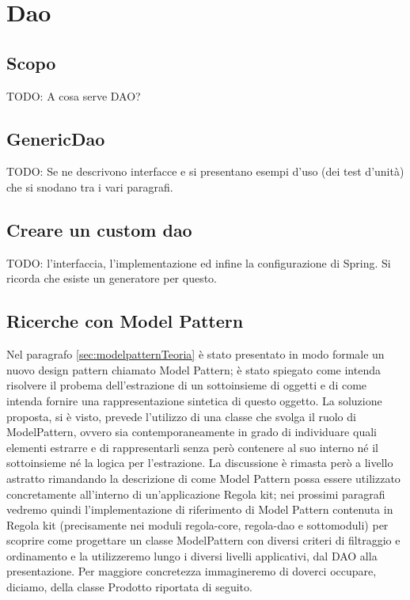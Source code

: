 \chapter{Dao}

\section{Scopo}
TODO: A cosa serve DAO?

\section{GenericDao}
TODO: Se ne descrivono interfacce e si presentano esempi d'uso (dei test d'unità) che si snodano tra i vari paragrafi.

\section{Creare un custom dao}
TODO: l'interfaccia, l'implementazione ed infine la configurazione di Spring. Si ricorda che esiste un generatore per questo.

\section{Ricerche con Model Pattern}\label{sec:modelpattern}
Nel paragrafo \vref{sec:modelpatternTeoria} è stato presentato in modo formale un nuovo design pattern chiamato Model Pattern; è stato spiegato come intenda risolvere il probema dell'estrazione di un sottoinsieme di oggetti e di come intenda fornire una rappresentazione sintetica di questo oggetto. La soluzione proposta, si è visto, prevede l'utilizzo di una classe che svolga il ruolo di ModelPattern, ovvero sia contemporaneamente in grado di individuare quali elementi estrarre e di rappresentarli senza però contenere al suo interno né il sottoinsieme né la logica per l'estrazione. La discussione è rimasta però a livello astratto rimandando la descrizione di come Model Pattern possa essere utilizzato concretamente all'interno di un'applicazione Regola kit; nei prossimi paragrafi vedremo quindi l'implementazione di riferimento di Model Pattern contenuta in Regola kit (precisamente nei moduli regola-core, regola-dao e sottomoduli) per scoprire come progettare un classe ModelPattern con diversi criteri di filtraggio e ordinamento e la utilizzeremo lungo i diversi livelli applicativi, dal DAO alla presentazione. Per maggiore concretezza immagineremo di doverci occupare, diciamo, della classe Prodotto riportata di seguito.

